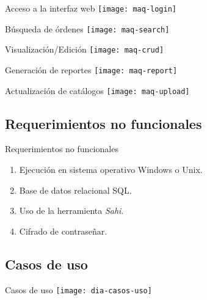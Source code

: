 	\begin{frame}{Acceso a la interfaz web}
		\centering
		\texttt{[image: maq-login]} 
	\end{frame}
	\begin{frame}{Búsqueda de órdenes}
		\centering
		\texttt{[image: maq-search]} 
	\end{frame}
	\begin{frame}{Visualización/Edición}
		\centering
		\texttt{[image: maq-crud]} 
	\end{frame}
	\begin{frame}{Generación de reportes}
		\centering
		\texttt{[image: maq-report]} 
	\end{frame}
	\begin{frame}{Actualización de catálogos}
		\centering
		\texttt{[image: maq-upload]}
	\end{frame}

\subsection{Requerimientos no funcionales}
	\begin{frame}{Requerimientos no funcionales}
		\begin{enumerate}
			\item Ejecución en sistema operativo Windows\textsuperscript{\textcopyright} o Unix.
			\item Base de datos relacional SQL.
			\item Uso de la herramienta \textit{Sahi}.
			\item Cifrado de contraseñar.
		\end{enumerate}
	\end{frame}

\subsection{Casos de uso}
	\begin{frame}{Casos de uso}
		\centering
		\texttt{[image: dia-casos-uso]} 
	\end{frame}

